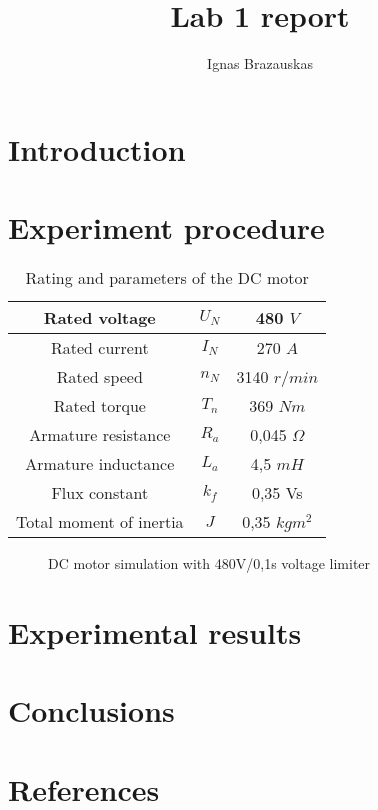 \documentclass{article}
\begin{document}
\author{Ignas Brazauskas}
\title{Lab 1 report}
\maketitle
\newpage

\tableofcontents{}
\newpage

\section{Introduction}

\newpage

\section{Experiment procedure}

\begin{table}[ht]
    \centering
    \begin{tabular}{c c c}
        \hline
        Rated voltage & $U_N$ & 480 $V$ \\
        \hline
        Rated current & $I_N$ & 270 $A$\\
        \hline
        Rated speed & $n_N$ & 3140 $r/min$\\
        \hline
        Rated torque & $T_n$ & 369 $Nm$\\
        \hline
        Armature resistance & $R_a$ & 0,045 $\Omega$\\
        \hline
        Armature inductance & $L_a$ & 4,5 $mH$\\
        \hline
        Flux constant & $k_f$ & 0,35 Vs\\
        \hline
        Total moment of inertia & $J$ & 0,35 $kgm^2$\\
        \hline
    \end{tabular}
    \caption{Rating and parameters of the DC motor}
    \label{motor paremeters}
\end{table}

\begin{figure}[h!]
    \caption{DC motor simulation with 480V/0,1s voltage limiter}
    \label{dcmotor:with-v-limit}
\end{figure}

\newpage

\section{Experimental results}
%

\newpage

\section{Conclusions}

\newpage

\section{References}
\end{document}
